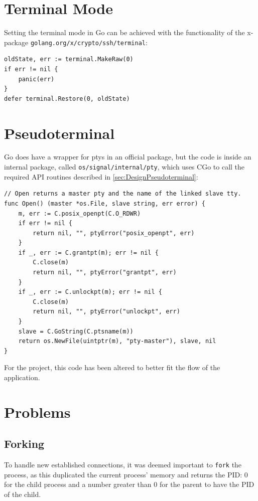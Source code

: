 \documentclass[10pt,a4paper,titlepage,twoside,english,final]{zhawreprt}
\begin{document}
\section{Terminal Mode}\label{sec:ImplTerminalMode}
Setting the \gls{terminal} mode in \gls{Go} can be achieved with the functionality of the x-package \linebreak\texttt{golang.org/x/crypto/ssh/terminal}:
\setlistingGo
\begin{lstlisting}[caption={Setting the \gls{terminal} mode in \gls{Go}},label=lst:GoTermMode]
oldState, err := terminal.MakeRaw(0)
if err != nil {
	panic(err)
}
defer terminal.Restore(0, oldState)
\end{lstlisting}

\section{Pseudoterminal}\label{sec:ImplPseudoterminal}
\gls{Go} does have a wrapper for \glspl{pty} in an official package, but the code is inside an internal package, called \texttt{os/signal/internal/pty}, which uses \gls{CGo} to call the required \gls{API} routines described in \ref{sec:DesignPseudoterminal}:
\setlistingGo
\begin{lstlisting}[caption={\gls{Go}'s \gls{pty} wrapper},label=lst:GoPty]
// Open returns a master pty and the name of the linked slave tty.
func Open() (master *os.File, slave string, err error) {
	m, err := C.posix_openpt(C.O_RDWR)
	if err != nil {
		return nil, "", ptyError("posix_openpt", err)
	}
	if _, err := C.grantpt(m); err != nil {
		C.close(m)
		return nil, "", ptyError("grantpt", err)
	}
	if _, err := C.unlockpt(m); err != nil {
		C.close(m)
		return nil, "", ptyError("unlockpt", err)
	}
	slave = C.GoString(C.ptsname(m))
	return os.NewFile(uintptr(m), "pty-master"), slave, nil
}
\end{lstlisting}
For the project, this code has been altered to better fit the flow of the application.

\section{Problems}\label{sec:Problems}
\subsection{Forking}\label{ssec:Forking}
To handle new established connections, it was deemed important to \texttt{fork} the process, as this duplicated the current process' memory and returns the \gls{PID}: 0 for the child process and a number greater than 0 for the parent to have the \gls{PID} of the child.
\end{document}
